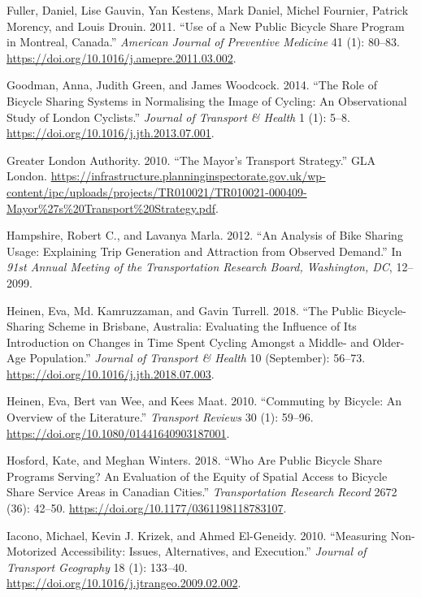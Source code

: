 \documentclass[]{article}
\begin{document}
\leavevmode\hypertarget{ref-fuller_use_2011}{}%
Fuller, Daniel, Lise Gauvin, Yan Kestens, Mark Daniel, Michel Fournier, Patrick Morency, and Louis Drouin. 2011. ``Use of a New Public Bicycle Share Program in Montreal, Canada.'' \emph{American Journal of Preventive Medicine} 41 (1): 80--83. \url{https://doi.org/10.1016/j.amepre.2011.03.002}.

\leavevmode\hypertarget{ref-goodman_role_2014}{}%
Goodman, Anna, Judith Green, and James Woodcock. 2014. ``The Role of Bicycle Sharing Systems in Normalising the Image of Cycling: An Observational Study of London Cyclists.'' \emph{Journal of Transport \& Health} 1 (1): 5--8. \url{https://doi.org/10.1016/j.jth.2013.07.001}.

\leavevmode\hypertarget{ref-greater_london_authority_mayors_2010}{}%
Greater London Authority. 2010. ``The Mayor's Transport Strategy.'' GLA London. \url{https://infrastructure.planninginspectorate.gov.uk/wp-content/ipc/uploads/projects/TR010021/TR010021-000409-Mayor\%27s\%20Transport\%20Strategy.pdf}.

\leavevmode\hypertarget{ref-hampshire_analysis_2012}{}%
Hampshire, Robert C., and Lavanya Marla. 2012. ``An Analysis of Bike Sharing Usage: Explaining Trip Generation and Attraction from Observed Demand.'' In \emph{91st Annual Meeting of the Transportation Research Board, Washington, DC}, 12--2099.

\leavevmode\hypertarget{ref-heinen_public_2018}{}%
Heinen, Eva, Md. Kamruzzaman, and Gavin Turrell. 2018. ``The Public Bicycle-Sharing Scheme in Brisbane, Australia: Evaluating the Influence of Its Introduction on Changes in Time Spent Cycling Amongst a Middle- and Older-Age Population.'' \emph{Journal of Transport \& Health} 10 (September): 56--73. \url{https://doi.org/10.1016/j.jth.2018.07.003}.

\leavevmode\hypertarget{ref-heinen_commuting_2010}{}%
Heinen, Eva, Bert van Wee, and Kees Maat. 2010. ``Commuting by Bicycle: An Overview of the Literature.'' \emph{Transport Reviews} 30 (1): 59--96. \url{https://doi.org/10.1080/01441640903187001}.

\leavevmode\hypertarget{ref-hosford_who_2018}{}%
Hosford, Kate, and Meghan Winters. 2018. ``Who Are Public Bicycle Share Programs Serving? An Evaluation of the Equity of Spatial Access to Bicycle Share Service Areas in Canadian Cities.'' \emph{Transportation Research Record} 2672 (36): 42--50. \url{https://doi.org/10.1177/0361198118783107}.

\leavevmode\hypertarget{ref-iacono_measuring_2010}{}%
Iacono, Michael, Kevin J. Krizek, and Ahmed El-Geneidy. 2010. ``Measuring Non-Motorized Accessibility: Issues, Alternatives, and Execution.'' \emph{Journal of Transport Geography} 18 (1): 133--40. \url{https://doi.org/10.1016/j.jtrangeo.2009.02.002}.
\end{document}
